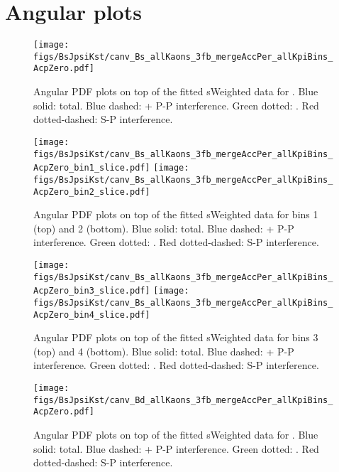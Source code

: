 \cleardoublepage
\chapter{Angular plots}\label{app:BsJpsiKst_angPlots}
\begin{figure}[h]
     \caption{\small Angular PDF plots on top of the fitted sWeighted data for \BsJpsiKst. Blue solid: total. Blue dashed: \pwave + P-P interference. Green dotted: \swave. Red dotted-dashed: S-P interference.}
     \texttt{[image: figs/BsJpsiKst/canv\_Bs\_allKaons\_3fb\_mergeAccPer\_allKpiBins\_AcpZero.pdf]}
\end{figure}
        
\begin{figure}[h]
     \caption{\small Angular PDF plots on top of the fitted sWeighted data for \BsJpsiKst \mkpi bins 1 (top) and 2 (bottom). Blue solid: total. Blue dashed: \pwave + P-P interference. Green dotted: \swave. Red dotted-dashed: S-P interference. }
     \texttt{[image: figs/BsJpsiKst/canv\_Bs\_allKaons\_3fb\_mergeAccPer\_allKpiBins\_AcpZero\_bin1\_slice.pdf]}     
     \texttt{[image: figs/BsJpsiKst/canv\_Bs\_allKaons\_3fb\_mergeAccPer\_allKpiBins\_AcpZero\_bin2\_slice.pdf]}     
     \label{fig:angular_plots_Bs_bin1_bin2}
\end{figure}

\begin{figure}[h]
     \caption{\small Angular PDF plots on top of the fitted sWeighted data for \BsJpsiKst \mkpi bins 3 (top) and 4 (bottom). Blue solid: total. Blue dashed: \pwave + P-P interference. Green dotted: \swave. Red dotted-dashed: S-P interference.  }
     \texttt{[image: figs/BsJpsiKst/canv\_Bs\_allKaons\_3fb\_mergeAccPer\_allKpiBins\_AcpZero\_bin3\_slice.pdf]}     
     \texttt{[image: figs/BsJpsiKst/canv\_Bs\_allKaons\_3fb\_mergeAccPer\_allKpiBins\_AcpZero\_bin4\_slice.pdf]}     
     \label{fig:angular_plots_Bs_bin3_bin4}
\end{figure}
\begin{figure}[h]
     \caption{\small Angular PDF plots on top of the fitted sWeighted data for \BdJpsiKst. Blue solid: total. Blue dashed: \pwave + P-P interference. Green dotted: \swave. Red dotted-dashed: S-P interference.  } 
     \texttt{[image: figs/BsJpsiKst/canv\_Bd\_allKaons\_3fb\_mergeAccPer\_allKpiBins\_AcpZero.pdf]}
     \label{fig:angular_plots_Bd}
\end{figure}

